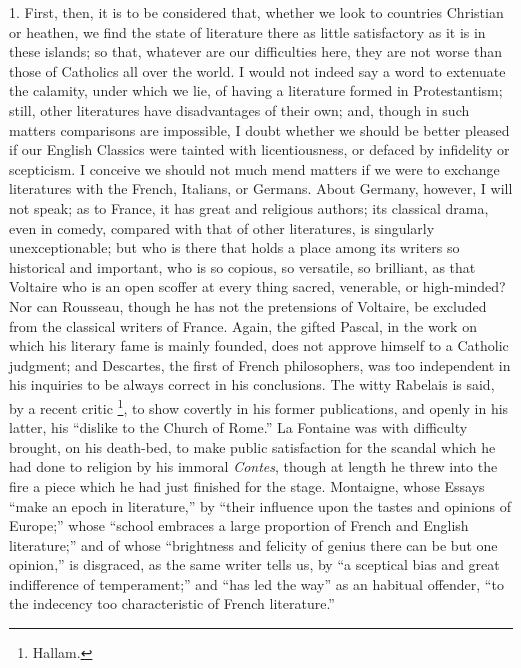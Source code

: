 1. First, then, it is to be considered that, whether we look to
countries Christian or heathen, we find the state of literature there
as little satisfactory as it is in these islands; so that, whatever
are our difficulties here, they are not worse than those of Catholics
all over the world. I would not indeed say a word to extenuate the
calamity, under which we lie, of having a literature formed in
Protestantism; still, other literatures have disadvantages of their
own; and, though in such matters comparisons are impossible, I doubt
whether we should be better pleased if our English Classics were
tainted with licentiousness, or defaced by infidelity or scepticism. I
conceive we should not much mend matters if we were to exchange
literatures with the French, Italians, or Germans. About Germany,
however, I will not speak; as to France, it has great and religious
authors; its classical drama, even in comedy, compared with that of
other literatures, is singularly unexceptionable; but who is there
that holds a place among its writers so historical and important, who
is so copious, so versatile, so brilliant, as that Voltaire who is an
open scoffer at every thing sacred, venerable, or high-minded? Nor can
Rousseau, though he has not the pretensions of Voltaire, be excluded
from the classical writers of France. Again, the gifted Pascal, in the
work on which his literary fame is mainly founded, does not approve
himself to a Catholic judgment; and Descartes, the first of French
philosophers, was too independent in his inquiries to be always
correct in his conclusions. The witty Rabelais is said, by a recent
critic \footnote{Hallam.}, to show
covertly in his former publications, and openly in his latter, his
``dislike to the Church of Rome.'' La Fontaine was with
difficulty brought, on his death-bed, to make public satisfaction for
the scandal which he had done to religion by his immoral \emph{Contes},
though at length he threw into the fire a piece which he had just
finished for the stage. Montaigne, whose Essays ``make an epoch in
literature,'' by ``their influence upon the tastes and
opinions of Europe;'' whose ``school embraces a large
proportion of French and English literature;'' and of whose
``brightness and felicity of genius there can be but one
opinion,'' is disgraced, as the same writer tells us, by ``a
sceptical bias and great indifference of temperament;'' and
``has led the way'' as an habitual offender, ``to
the indecency too characteristic of French literature.''

